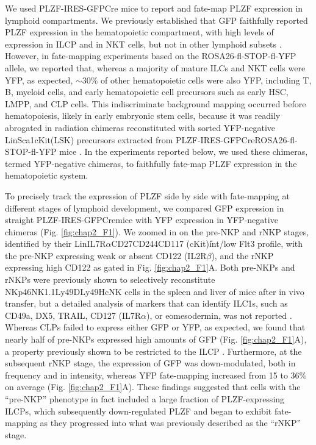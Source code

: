 We used PLZF-IRES-GFPCre mice to report and fate-map PLZF expression in lymphoid compartments. We previously established that GFP faithfully reported PLZF expression in the hematopoietic compartment, with high levels of expression in ILCP and in NKT cells, but not in other lymphoid subsets \cite{constantinides2014}. However, in fate-mapping experiments based on the ROSA26-fl-STOP-fl-YFP allele, we reported that, whereas a majority of mature ILCs and NKT cells were YFP\UP, as expected, $\sim$30\% of other hematopoietic cells were also YFP\UP, including T, B, myeloid cells, and early hematopoietic cell precursors such as early HSC, LMPP, and CLP cells. This indiscriminate background mapping occurred before hematopoiesis, likely in early embryonic stem cells, because it was readily abrogated in radiation chimeras reconstituted with sorted YFP-negative Lin\UM Sca1\UP cKit\UP (LSK) precursors extracted from PLZF-IRES-GFPCre\UP ROSA26-fl-STOP-fl-YFP mice \cite{constantinides2014}. In the experiments reported below, we used these chimeras, termed YFP-negative chimeras, to faithfully fate-map PLZF expression in the hematopoietic system.

To precisely track the expression of PLZF side by side with fate-mapping at different stages of lymphoid development, we compared GFP expression in straight PLZF-IRES-GFPCre\UP mice with YFP expression in YFP-negative chimeras (Fig. \ref{fig:chap2_F1}). We zoomed in on the pre-NKP and rNKP stages, identified by their Lin\UM IL7R$\alpha$\UP CD27\UP CD244\UP CD117 (cKit)\U{int/low} Flt3\UM{} profile, with the pre-NKP expressing weak or absent CD122 (IL2R$\beta$), and the rNKP expressing high CD122 \cite{fathman2011} as gated in Fig. \ref{fig:chap2_F1}A. Both pre-NKPs and rNKPs were previously shown to selectively reconstitute \CDte\UM NKp46\UP NK1.1\UP Ly49D\UP Ly49H\UP cNK cells in the spleen and liver of \Ragrg mice after in vivo transfer, but a detailed analysis of markers that can identify ILC1s, such as CD49a, DX5, TRAIL, CD127 (IL7R$\alpha$), or eomesodermin, was not reported \cite{fathman2011}. Whereas CLPs failed to express either GFP or YFP, as expected, we found that nearly half of pre-NKPs expressed high amounts of GFP (Fig. \ref{fig:chap2_F1}A), a property previously shown to be restricted to the ILCP \cite{constantinides2014}. Furthermore, at the subsequent rNKP stage, the expression of GFP was down-modulated, both in frequency and in intensity, whereas YFP fate-mapping increased from 15 to 36\% on average (Fig. \ref{fig:chap2_F1}A). These findings suggested that cells with the “pre-NKP” phenotype in fact included a large fraction of PLZF-expressing ILCPs, which subsequently down-regulated PLZF and began to exhibit fate-mapping as they progressed into what was previously described as the “rNKP” stage.

